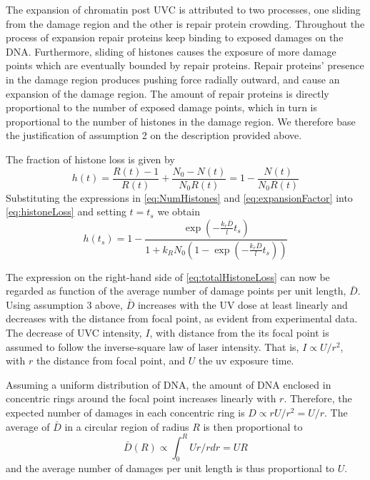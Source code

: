 \documentclass[12pt]{paper}
\begin{document}
The expansion of chromatin post UVC is attributed to two processes, one sliding from the damage region and the other is repair protein crowding. Throughout the process of expansion repair proteins keep binding to exposed damages on the DNA. Furthermore, sliding of histones causes the exposure of more damage points which are eventually bounded by repair proteins. Repair proteins' presence in the damage region produces pushing force radially outward, and cause an expansion of the damage region. The amount of repair proteins is directly proportional to the number of exposed damage points, which in turn is proportional to the number of histones in the damage region. We therefore base the justification of assumption 2 on the description provided above. 

The fraction of histone loss is given by   
\begin{equation}\label{eq:histoneLoss}
h(t) = \frac{R(t)-1}{R(t)} +\frac{N_0-N(t)}{N_0R(t)}=1-\frac{N(t)}{N_0R(t)}
\end{equation}
Substituting the expressions in \ref{eq:NumHistones} and \ref{eq:expansionFactor} into \ref{eq:histoneLoss} and setting $t=t_s$ we obtain 
\begin{equation}\label{eq:totalHistoneLoss}
h(t_s)=1-\frac{\exp(-\frac{k_r\bar{D}}{l}t_s)}{ 1+k_RN_0(1-\exp(-\frac{k_r\bar{D}}{l}t_s))}
\end{equation}

The expression on the right-hand side of \ref{eq:totalHistoneLoss} can now be regarded as function of the average number of damage points per unit length, $\bar{D}$. Using assumption 3 above, $\bar{D}$ increases with the UV dose at least linearly and decreases with the distance from focal point, as evident from experimental data. The decrease of UVC intensity, $I$, with distance from the its focal point is assumed to follow the inverse-square law of laser intensity. That is, $I\propto U/r^2$, with $r$ the distance from focal point, and $U$ the uv exposure time. 

Assuming a uniform distribution of DNA, the amount of DNA enclosed in concentric rings around the focal point increases linearly with $r$. Therefore, the expected number of damages in each concentric ring is $D\propto rU/r^2=U/r$. 
The average of $\bar{D}$ in a circular region of radius $R$ is then proportional to 
\begin{equation}
\bar{D}(R)\propto \int_0^R Ur/r dr = UR
\end{equation}
and the average number of damages per unit length is thus proportional to $U$.
\end{document}

